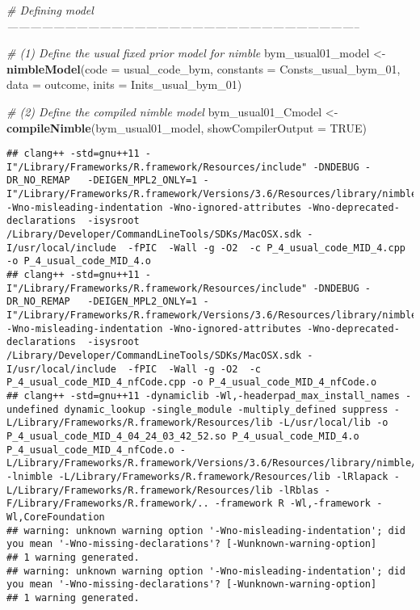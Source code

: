 \documentclass[]{article}
\newenvironment{Shaded}{\begin{snugshade}}{\end{snugshade}}
\newcommand{\CommentTok}[1]{\textcolor[rgb]{0.56,0.35,0.01}{\textit{#1}}}
\newcommand{\DataTypeTok}[1]{\textcolor[rgb]{0.13,0.29,0.53}{#1}}
\newcommand{\DecValTok}[1]{\textcolor[rgb]{0.00,0.00,0.81}{#1}}
\newcommand{\KeywordTok}[1]{\textcolor[rgb]{0.13,0.29,0.53}{\textbf{#1}}}
\newcommand{\NormalTok}[1]{#1}
\newcommand{\OtherTok}[1]{\textcolor[rgb]{0.56,0.35,0.01}{#1}}
\newcommand{\StringTok}[1]{\textcolor[rgb]{0.31,0.60,0.02}{#1}}
\begin{document}
\begin{Shaded}
\begin{Highlighting}[]
\CommentTok{# Defining model --------------------------------------------------------------------------------------------}

\CommentTok{# (1) Define the usual fixed prior model for nimble}
\NormalTok{bym_usual01_model <-}\StringTok{ }\KeywordTok{nimbleModel}\NormalTok{(}\DataTypeTok{code =}\NormalTok{ usual_code_bym, }\DataTypeTok{constants =}\NormalTok{ Consts_usual_bym_}\DecValTok{01}\NormalTok{, }
                             \DataTypeTok{data =}\NormalTok{ outcome, }\DataTypeTok{inits =}\NormalTok{ Inits_usual_bym_}\DecValTok{01}\NormalTok{)}

\CommentTok{# (2) Define the compiled nimble model}
\NormalTok{bym_usual01_Cmodel <-}\StringTok{ }\KeywordTok{compileNimble}\NormalTok{(bym_usual01_model, }\DataTypeTok{showCompilerOutput =} \OtherTok{TRUE}\NormalTok{)      }
\end{Highlighting}
\end{Shaded}

\begin{verbatim}
## clang++ -std=gnu++11 -I"/Library/Frameworks/R.framework/Resources/include" -DNDEBUG -DR_NO_REMAP   -DEIGEN_MPL2_ONLY=1 -I"/Library/Frameworks/R.framework/Versions/3.6/Resources/library/nimble/include" -Wno-misleading-indentation -Wno-ignored-attributes -Wno-deprecated-declarations  -isysroot /Library/Developer/CommandLineTools/SDKs/MacOSX.sdk -I/usr/local/include  -fPIC  -Wall -g -O2  -c P_4_usual_code_MID_4.cpp -o P_4_usual_code_MID_4.o
## clang++ -std=gnu++11 -I"/Library/Frameworks/R.framework/Resources/include" -DNDEBUG -DR_NO_REMAP   -DEIGEN_MPL2_ONLY=1 -I"/Library/Frameworks/R.framework/Versions/3.6/Resources/library/nimble/include" -Wno-misleading-indentation -Wno-ignored-attributes -Wno-deprecated-declarations  -isysroot /Library/Developer/CommandLineTools/SDKs/MacOSX.sdk -I/usr/local/include  -fPIC  -Wall -g -O2  -c P_4_usual_code_MID_4_nfCode.cpp -o P_4_usual_code_MID_4_nfCode.o
## clang++ -std=gnu++11 -dynamiclib -Wl,-headerpad_max_install_names -undefined dynamic_lookup -single_module -multiply_defined suppress -L/Library/Frameworks/R.framework/Resources/lib -L/usr/local/lib -o P_4_usual_code_MID_4_04_24_03_42_52.so P_4_usual_code_MID_4.o P_4_usual_code_MID_4_nfCode.o -L/Library/Frameworks/R.framework/Versions/3.6/Resources/library/nimble/CppCode -lnimble -L/Library/Frameworks/R.framework/Resources/lib -lRlapack -L/Library/Frameworks/R.framework/Resources/lib -lRblas -F/Library/Frameworks/R.framework/.. -framework R -Wl,-framework -Wl,CoreFoundation
## warning: unknown warning option '-Wno-misleading-indentation'; did you mean '-Wno-missing-declarations'? [-Wunknown-warning-option]
## 1 warning generated.
## warning: unknown warning option '-Wno-misleading-indentation'; did you mean '-Wno-missing-declarations'? [-Wunknown-warning-option]
## 1 warning generated.
\end{verbatim}
\end{document}
